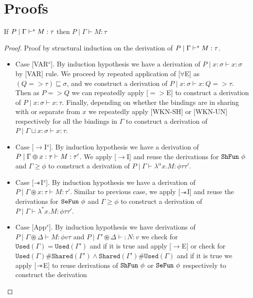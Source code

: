 \chapter{Proofs}
\begin{thm}\label{thm:soundness-syntax-directed}
   If $P \mid \Gamma \vdash^s M:\tau$ then $P \mid \Gamma \vdash M:\tau$
\end{thm}
\begin{proof}
  Proof by structural induction on the derivation of $P \mid \Gamma \vdash^s M:\tau$.

  \begin{itemize}
  \item{Case [VAR$^s$].}
    By induction hypothesis we have a derivation of $P \mid x:\sigma \vdash x:\sigma$ by [VAR] rule.
    We proceed by repeated application of [$\forall$E] as $(Q => \tau) \sqsubseteq \sigma$, and
    we construct a derivation of $P \mid x:\sigma \vdash x: Q => \tau$. Then as $P => Q$ we can
    repeatedly apply [$=>$E] to construct a derivation of $P \mid x:\sigma \vdash x:\tau$.
    Finally, depending on whether the bindings are in sharing with or separate from
    $x$ we repeatedly apply [WKN-SH] or [WKN-UN] respectively for all the bindings in $\Gamma$ to construct
    a derivation of $P \mid \Gamma \sqcup x:\sigma \vdash x:\tau$.
  \item{Case [$\rightarrow$I$^s$].}
    By induction hypothesis we have a derivation of $P \mid \Gamma \varoplus x:\tau \vdash M:\tau'$.
    We apply [$\rightarrow$I] and reuse the derivations for $\texttt{ShFun}\ \phi$ and $\Gamma \geq \phi$  to
    construct a derivation of $P \mid \Gamma \vdash \lambda^{\alpha}x. M: \phi \tau \tau'$.
  \item{Case [$\mathrel{-\mkern-6mu*}$I$^s$].}
    By induction hypothesis we have a derivation of $P \mid \Gamma \circledast x:\tau \vdash M:\tau'$.
    Similar to previous case, we apply [$\mathrel{-\mkern-6mu*}$I] and reuse the derivations for $\texttt{SeFun}\ \phi$ and $\Gamma \geq \phi$  to
    construct a derivation of $P \mid \Gamma \vdash \lambda^{*}x. M: \phi \tau \tau'$.
  \item{Case [App$^s$].}
    By induction hypothesis we have derivations of $P \mid \Gamma \circledast \Delta \vdash M: \phi v \tau$ and
    $P \mid \Gamma' \circledast \Delta \vdash: N:v$ we check for $\texttt{Used}(\Gamma) = \texttt{Used}(\Gamma')$ and if it is true
    and apply [$\rightarrow$E] or check for $\texttt{Used}(\Gamma)\#\texttt{Shared}(\Gamma') \wedge \texttt{Shared}(\Gamma')\#\texttt{Used}(\Gamma)$
    and if it is true we apply [$\mathrel{-\mkern-6mu*}$E] to reuse derivations of $\texttt{ShFun}\ \phi$ or $\texttt{SeFun}\ \phi$ respectively to construct the derivation

\end{itemize}
\end{proof}

